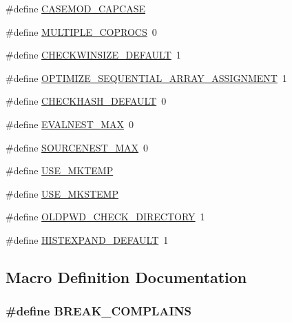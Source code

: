 \begin{DoxyCompactItemize}
\item 
\#define \hyperlink{config-top_8h_a09dd888107904e50bb7de392b9f3e09c}{C\+A\+S\+E\+M\+O\+D\+\_\+\+C\+A\+P\+C\+A\+SE}
\item 
\#define \hyperlink{config-top_8h_a3c5a0eebff8d0ea0d8e669d401ec53b4}{M\+U\+L\+T\+I\+P\+L\+E\+\_\+\+C\+O\+P\+R\+O\+CS}~0
\item 
\#define \hyperlink{config-top_8h_a533e5612b0a36f3dde51f89fb40c87f0}{C\+H\+E\+C\+K\+W\+I\+N\+S\+I\+Z\+E\+\_\+\+D\+E\+F\+A\+U\+LT}~1
\item 
\#define \hyperlink{config-top_8h_a62ce9562c5afc6f8617a25673239f3db}{O\+P\+T\+I\+M\+I\+Z\+E\+\_\+\+S\+E\+Q\+U\+E\+N\+T\+I\+A\+L\+\_\+\+A\+R\+R\+A\+Y\+\_\+\+A\+S\+S\+I\+G\+N\+M\+E\+NT}~1
\item 
\#define \hyperlink{config-top_8h_a0215ebc13592f64b00cb311db6b0f6f4}{C\+H\+E\+C\+K\+H\+A\+S\+H\+\_\+\+D\+E\+F\+A\+U\+LT}~0
\item 
\#define \hyperlink{config-top_8h_a2f96397cc723fb96bcc3c21505bb97e4}{E\+V\+A\+L\+N\+E\+S\+T\+\_\+\+M\+AX}~0
\item 
\#define \hyperlink{config-top_8h_af2d241a622bd7d59c289bcbf8451a6df}{S\+O\+U\+R\+C\+E\+N\+E\+S\+T\+\_\+\+M\+AX}~0
\item 
\#define \hyperlink{config-top_8h_a0b3e8c86db82daecd0ca180443da5605}{U\+S\+E\+\_\+\+M\+K\+T\+E\+MP}
\item 
\#define \hyperlink{config-top_8h_a4e70124cb31024337915114c87bf16a6}{U\+S\+E\+\_\+\+M\+K\+S\+T\+E\+MP}
\item 
\#define \hyperlink{config-top_8h_a99615699ac585d66f0fd356a6ba29128}{O\+L\+D\+P\+W\+D\+\_\+\+C\+H\+E\+C\+K\+\_\+\+D\+I\+R\+E\+C\+T\+O\+RY}~1
\item 
\#define \hyperlink{config-top_8h_a630ddf8653e9dc70ac765ed521c1e6bd}{H\+I\+S\+T\+E\+X\+P\+A\+N\+D\+\_\+\+D\+E\+F\+A\+U\+LT}~1
\end{DoxyCompactItemize}


\subsection{Macro Definition Documentation}
\subsubsection[{\texorpdfstring{B\+R\+E\+A\+K\+\_\+\+C\+O\+M\+P\+L\+A\+I\+NS}{BREAK_COMPLAINS}}]{\setlength{\rightskip}{0pt plus 5cm}\#define B\+R\+E\+A\+K\+\_\+\+C\+O\+M\+P\+L\+A\+I\+NS}\hypertarget{config-top_8h_a9d763abc86e456a73acea0769e3e206a}{}\label{config-top_8h_a9d763abc86e456a73acea0769e3e206a}
